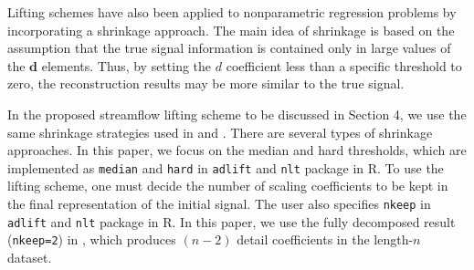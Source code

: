 \documentclass[11pt,titlepage]{article}
\begin{document}
Lifting schemes have also been applied to nonparametric regression problems by incorporating a shrinkage approach. The main idea of shrinkage is based on the assumption that the true signal information is contained only in large values of the $\mathbf{d}$ elements. Thus, by setting the $d$ coefficient less than a specific threshold to zero, the reconstruction results may be more similar to the true signal.

In the proposed streamflow lifting scheme to be discussed in Section 4, we use the same shrinkage strategies used in \cite{Nunes2006} and \cite{Knight2009}. There are several types of shrinkage approaches. In this paper, we focus on the median and hard thresholds, which are implemented as \texttt{median} and \texttt{hard} in \texttt{adlift} and \texttt{nlt} package in R. To use the lifting scheme, one must decide the number of scaling coefficients to be kept in the final representation of the initial signal. The user also specifies \texttt{nkeep} in \texttt{adlift} and \texttt{nlt} package in R. In this paper, we use the fully decomposed result (\texttt{nkeep=2}) in \cite{Knight2009}, which produces $(n-2)$ detail coefficients in the length-$n$ dataset. 
 
\end{document}
